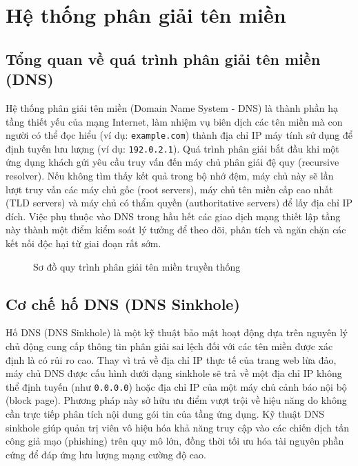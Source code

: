 \section{Hệ thống phân giải tên miền}

\subsection{Tổng quan về quá trình phân giải tên miền (DNS)}
Hệ thống phân giải tên miền (Domain Name System - DNS) là thành phần hạ tầng thiết yếu của mạng Internet, làm nhiệm vụ biên dịch các tên miền mà con người có thể đọc hiểu (ví dụ: \texttt{example.com}) thành địa chỉ IP máy tính sử dụng để định tuyến lưu lượng (ví dụ: \texttt{192.0.2.1}). Quá trình phân giải bắt đầu khi một ứng dụng khách gửi yêu cầu truy vấn đến máy chủ phân giải đệ quy (recursive resolver). Nếu không tìm thấy kết quả trong bộ nhớ đệm, máy chủ này sẽ lần lượt truy vấn các máy chủ gốc (root servers), máy chủ tên miền cấp cao nhất (TLD servers) và máy chủ có thẩm quyền (authoritative servers) để lấy địa chỉ IP đích. Việc phụ thuộc vào DNS trong hầu hết các giao dịch mạng thiết lập tầng này thành một điểm kiểm soát lý tưởng để theo dõi, phân tích và ngăn chặn các kết nối độc hại từ giai đoạn rất sớm.

\begin{figure}[htp]
    \centering
    
    \caption{Sơ đồ quy trình phân giải tên miền truyền thống}
    \label{fig:dns_traditional}
\end{figure}


\subsection{Cơ chế hố DNS (DNS Sinkhole)}
Hố DNS (DNS Sinkhole) là một kỹ thuật bảo mật hoạt động dựa trên nguyên lý chủ động cung cấp thông tin phân giải sai lệch đối với các tên miền được xác định là có rủi ro cao. Thay vì trả về địa chỉ IP thực tế của trang web lừa đảo, máy chủ DNS được cấu hình dưới dạng sinkhole sẽ trả về một địa chỉ IP không thể định tuyến (như \texttt{0.0.0.0}) hoặc địa chỉ IP của một máy chủ cảnh báo nội bộ (block page). Phương pháp này sở hữu ưu điểm vượt trội về hiệu năng do không cần trực tiếp phân tích nội dung gói tin của tầng ứng dụng. Kỹ thuật DNS sinkhole giúp quản trị viên vô hiệu hóa khả năng truy cập vào các chiến dịch tấn công giả mạo (phishing) trên quy mô lớn, đồng thời tối ưu hóa tài nguyên phần cứng để đáp ứng lưu lượng mạng cường độ cao.

